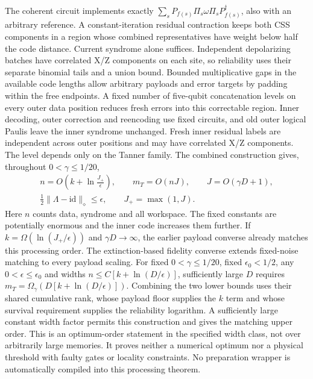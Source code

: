 \documentclass[11pt,a4paper]{article}
\begin{document}
The coherent circuit implements exactly $\sum_sP_{f(s)}\Pi_s\omega\Pi_sP_{f(s)}^\dagger$, also with an arbitrary reference. A constant-iteration residual contraction keeps both CSS components in a region whose combined representatives have weight below half the code distance. Current syndrome alone suffices. Independent depolarizing batches have correlated X/Z components on each site, so reliability uses their separate binomial tails and a union bound. Bounded multiplicative gaps in the available code lengths allow arbitrary payloads and error targets by padding within the free endpoints. A fixed number of five-qubit concatenation levels on every outer data position reduces fresh errors into this correctable region. Inner decoding, outer correction and reencoding use fixed circuits, and old outer logical Paulis leave the inner syndrome unchanged. Fresh inner residual labels are independent across outer positions and may have correlated X/Z components. The level depends only on the Tanner family. The combined construction gives, throughout $0<\gamma\le1/20$,
\[
\begin{gathered}
n=O\!\left(k+\ln\frac{J_+}{\epsilon}\right),\qquad m_T=O(nJ),\qquad J=O(\gamma D+1),\\
\tfrac12\lVert\Lambda-\mathrm{id}\rVert_\diamond\le\epsilon,
\qquad J_+=\max(1,J).
\end{gathered}
\]
Here $n$ counts data, syndrome and all workspace. The fixed constants are potentially enormous and the inner code increases them further. If $k=\Omega(\ln(J_+/\epsilon))$ and $\gamma D\to\infty$, the earlier payload converse already matches this processing order. The extinction-based fidelity converse extends fixed-noise matching to every payload scaling. For fixed $0<\gamma\le1/20$, fixed $\epsilon_0<1/2$, any $0<\epsilon\le\epsilon_0$ and widths $n\le C[k+\ln(D/\epsilon)]$, sufficiently large $D$ requires $m_T=\Omega_\gamma(D[k+\ln(D/\epsilon)])$. Combining the two lower bounds uses their shared cumulative rank, whose payload floor supplies the $k$ term and whose survival requirement supplies the reliability logarithm. A sufficiently large constant width factor permits this construction and gives the matching upper order. This is an optimum-order statement in the specified width class, not over arbitrarily large memories. It proves neither a numerical optimum nor a physical threshold with faulty gates or locality constraints. No preparation wrapper is automatically compiled into this processing theorem.
\end{document}

